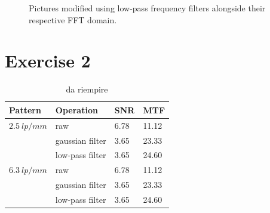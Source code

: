 \documentclass[a4paper]{article}
\begin{document}
\begin{figure}[!htb]
  \quad
	\caption{Pictures modified using low-pass frequency filters alongside their respective FFT domain.}
  \label{fig:ex_one_fft}
\end{figure}

\clearpage





\section*{Exercise 2}
\begin{table}[h]
	\centering
	\begin{tabular}{| l | l | l | l | }
		\hline
		Pattern & Operation & SNR & MTF \\ \hline
		$2.5\ lp/mm$& raw & 6.78 & 11.12 \\ \hline
		& gaussian filter & 3.65 & 23.33 \\ \hline
		& low-pass filter & 3.65 & 24.60 \\ \hline
		$6.3\ lp/mm$& raw & 6.78 & 11.12 \\ \hline
		& gaussian filter & 3.65 & 23.33 \\ \hline
		& low-pass filter & 3.65 & 24.60 \\ \hline
	\end{tabular}
	\caption{da riempire}
  \label{tab:ex_two}
\end{table}
\end{document}
